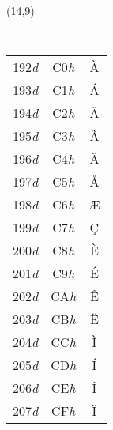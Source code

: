 \documentclass[a4paper, landscape, 10pt]{article} %
\begin{document}
\begin{textblock}{3}(14,9)
{\tt
  \begin{tabular*}{\textwidth}{|ccc}
    \hline
    192\textit{d} & C0\textit{h} & \`{A} \\
    193\textit{d} & C1\textit{h} & \'{A} \\
    194\textit{d} & C2\textit{h} & \^{A} \\
    195\textit{d} & C3\textit{h} & \~{A} \\
    196\textit{d} & C4\textit{h} & \"{A} \\
    197\textit{d} & C5\textit{h} & \AA \\
    198\textit{d} & C6\textit{h} & \AE \\
    199\textit{d} & C7\textit{h} & \c{C} \\
    200\textit{d} & C8\textit{h} & \`{E} \\
    201\textit{d} & C9\textit{h} & \'{E} \\
    202\textit{d} & CA\textit{h} & \^{E} \\
    203\textit{d} & CB\textit{h} & \"{E} \\
    204\textit{d} & CC\textit{h} & \`{I} \\
    205\textit{d} & CD\textit{h} & \'{I} \\
    206\textit{d} & CE\textit{h} & \^{I} \\
    207\textit{d} & CF\textit{h} & \"{I} \\
    \hline
  \end{tabular*}
}
\end{textblock}
\end{document}
